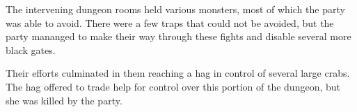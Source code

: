 The intervening dungeon rooms held various monsters, most of which the party was able to avoid.
There were a few traps that could not be avoided, but the party mananged to make their way through these fights and disable several more black gates.

Their efforts culminated in them reaching a hag in control of several large crabs.
The hag offered to trade help for control over this portion of the dungeon, but she was killed by the party.
